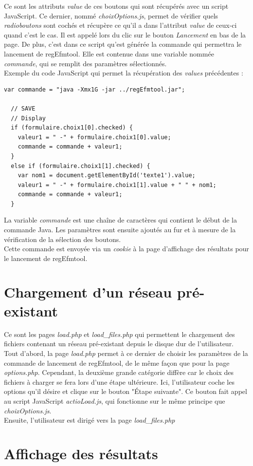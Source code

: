 Ce sont les attributs \textit{value} de ces boutons qui sont récupérés avec un script JavaScript. Ce dernier, nommé \emph{choixOptions.js}, permet de vérifier quels \textit{radioboutons} sont cochés et récupère ce qu'il a dans l'attribut \textit{value} de ceux-ci quand c'est le cas. Il est appelé lors du clic sur le bouton \textit{Lancement} en bas de la page. De plus, c'est dans ce script qu'est générée la commande qui permettra le lancement de regEfmtool. Elle est contenue dans une variable nommée  \textit{commande}, qui se remplit des paramètres sélectionnés. \\

Exemple du code JavaScript qui permet la récupération des \textit{values} précédentes : \\

\begin{DDbox}{\linewidth}
\begin{lstlisting}
var commande = "java -Xmx1G -jar ../regEfmtool.jar";

  // SAVE
  // Display
  if (formulaire.choix1[0].checked) { 
    valeur1 = " -" + formulaire.choix1[0].value; 
    commande = commande + valeur1;
  }
  else if (formulaire.choix1[1].checked) { 
    var nom1 = document.getElementById('texte1').value;
    valeur1 = " -" + formulaire.choix1[1].value + " " + nom1; 
    commande = commande + valeur1;
  }
\end{lstlisting}
\end{DDbox}

La variable \textit{commande} est une chaîne de caractères qui contient le début de la commande Java. Les paramètres sont ensuite ajoutés au fur et à mesure de la vérification de la sélection des boutons. \\

Cette commande est envoyée via un \textit{cookie} à la page d'affichage des résultats pour le lancement de regEfmtool. 

\section{Chargement d'un réseau pré-existant}

Ce sont les pages \emph{load.php} et \emph{load\_files.php} qui permettent le chargement des fichiers contenant un réseau pré-existant depuis le disque dur de l'utilisateur. Tout d'abord, la page \emph{load.php} permet à ce dernier de choisir les paramètres de la commande de lancement de regEfmtool, de le même façon que pour la page \emph{options.php}. Cependant, la deuxième grande catégorie diffère car le choix des fichiers à charger se fera lors d'une étape ultérieure. Ici, l'utilisateur coche les options qu'il désire et clique sur le bouton "Étape suivante". Ce bouton fait appel au script JavaScript \emph{actioLoad.js}, qui fonctionne sur le même principe que \emph{choixOptions.js}. \\

Ensuite, l'utilisateur est dirigé vers la page \emph{load\_files.php} 

\section{Affichage des résultats}




